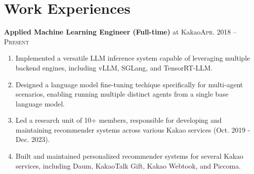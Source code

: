 \documentclass[11pt,a4paper]{article}
\renewenvironment{itemize}{
  \begin{list}{}{
    \setlength{\leftmargin}{1em}
    \setlength{\itemsep}{0.25em}
    \setlength{\parskip}{0pt}
    \setlength{\parsep}{0.25em}
  }
}{
  \end{list}
}
\begin{document}
\section*{Work Experiences}
\begin{itemize}
  \setlength\itemsep{0.1em}
  \item \textbf{Applied Machine Learning Engineer (Full-time)} at Kakao\hfill\textsc{Apr. 2018 -- Present}
  \begin{enumerate}
    \item Implemented a versatile LLM inference system capable of leveraging multiple backend engines, including vLLM, SGLang, and TensorRT-LLM.
    \item Designed a language model fine-tuning techique specifically for multi-agent scenarios, enabling running multiple distinct agents from a single base language model.
    \item Led a research unit of 10+ members, responsible for developing and maintaining recommender systems across various Kakao services (Oct. 2019 - Dec. 2023).
    \item Built and maintained personalized recommender systems for several Kakao services, including Daum, KakaoTalk Gift, Kakao Webtook, and Piccoma.
  \end{enumerate}
\end{itemize}

\end{document}
